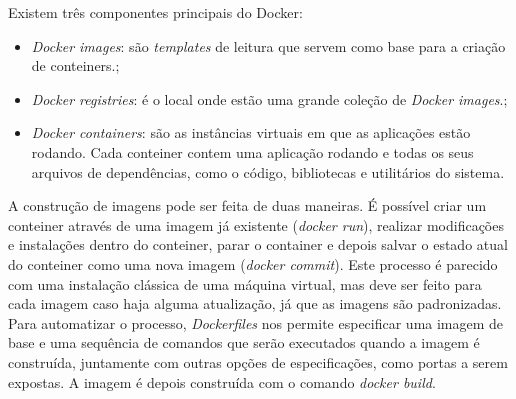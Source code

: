 Existem três componentes principais do Docker:

\begin{itemize}
	\item \textit{Docker images}: são \textit{templates} de leitura que servem como base para a criação de conteiners.;
	\item \textit{Docker registries}: é o local onde estão uma grande coleção de \textit{Docker images}.;
	\item \textit{Docker containers}: são as instâncias virtuais em que as aplicações estão rodando. Cada conteiner contem uma aplicação rodando e todas os seus arquivos de dependências, como o código, bibliotecas e utilitários do sistema.
\end{itemize}

A construção de imagens pode ser feita de duas maneiras. É possível criar um conteiner através de uma imagem já existente (\textit{docker run}), realizar modificações e instalações dentro do conteiner, parar o container e depois salvar o estado atual do conteiner como uma nova imagem (\textit{docker commit}). Este processo é parecido com uma instalação clássica de uma máquina virtual, mas deve ser feito para cada imagem caso haja alguma atualização, já que as imagens são padronizadas. Para automatizar o processo, \textit{Dockerfiles} nos permite especificar uma imagem de base e uma sequência de comandos que serão executados quando a imagem é construída, juntamente com outras opções de especificações, como portas a serem expostas. A imagem é depois construída com o comando \textit{docker build}.\cite{DiPietro}
